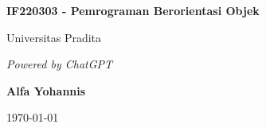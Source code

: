 \documentclass{book}
\begin{document}
	
	\begin{titlepage}
		\centering
		\vspace*{1cm}
		
		\Huge
		\textbf{IF220303 - Pemrograman Berorientasi Objek}
		
		\vspace{0.5cm}
		
		\LARGE
		Universitas Pradita
		
		\vspace{1.5cm}
		
		\textit{Powered by ChatGPT}
		
		\vspace{2cm}
		
		\textbf{Alfa Yohannis}
		
		\vspace{0.8cm}
		
		\today
		
		\vfill
	\end{titlepage}
	
	\tableofcontents
	
	
	
	
	
	
%	
%	
	
	
	
	
	
	
	
	
\end{document}

